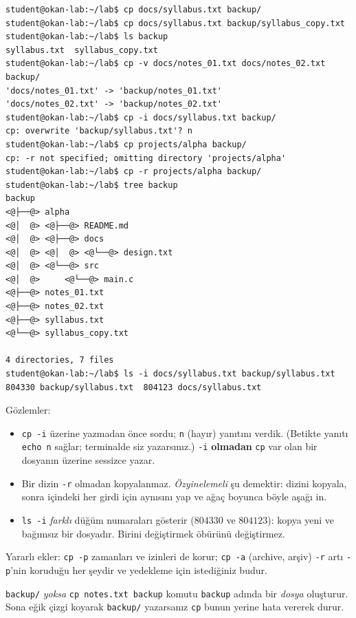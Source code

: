 \documentclass[11pt,a4paper]{article}
\newcommand{\cmd}[1]{\texttt{#1}}
\begin{document}
\begin{lstlisting}[style=term]
student@okan-lab:~/lab$ cp docs/syllabus.txt backup/
student@okan-lab:~/lab$ cp docs/syllabus.txt backup/syllabus_copy.txt
student@okan-lab:~/lab$ ls backup
syllabus.txt  syllabus_copy.txt
student@okan-lab:~/lab$ cp -v docs/notes_01.txt docs/notes_02.txt backup/
'docs/notes_01.txt' -> 'backup/notes_01.txt'
'docs/notes_02.txt' -> 'backup/notes_02.txt'
student@okan-lab:~/lab$ cp -i docs/syllabus.txt backup/
cp: overwrite 'backup/syllabus.txt'? n
student@okan-lab:~/lab$ cp projects/alpha backup/
cp: -r not specified; omitting directory 'projects/alpha'
student@okan-lab:~/lab$ cp -r projects/alpha backup/
student@okan-lab:~/lab$ tree backup
backup
<@├──@> alpha
<@│  @> <@├──@> README.md
<@│  @> <@├──@> docs
<@│  @> <@│  @> <@└──@> design.txt
<@│  @> <@└──@> src
<@│  @>     <@└──@> main.c
<@├──@> notes_01.txt
<@├──@> notes_02.txt
<@├──@> syllabus.txt
<@└──@> syllabus_copy.txt

4 directories, 7 files
student@okan-lab:~/lab$ ls -i docs/syllabus.txt backup/syllabus.txt
804330 backup/syllabus.txt  804123 docs/syllabus.txt
\end{lstlisting}

Gözlemler:
\begin{itemize}
  \item \cmd{cp -i} üzerine yazmadan önce sordu; \texttt{n} (hayır) yanıtını verdik. (Betikte yanıtı \cmd{echo n} sağlar; terminalde siz yazarsınız.) \cmd{-i} \textbf{olmadan} \cmd{cp} var olan bir dosyanın üzerine sessizce yazar.
  \item Bir dizin \cmd{-r} olmadan kopyalanmaz. \emph{Özyinelemeli} şu demektir: dizini kopyala, sonra içindeki her girdi için aynısını yap ve ağaç boyunca böyle aşağı in.
  \item \cmd{ls -i} \emph{farklı} düğüm numaraları gösterir ($804330$ ve $804123$): kopya yeni ve bağımsız bir dosyadır. Birini değiştirmek öbürünü değiştirmez.
\end{itemize}
Yararlı ekler: \cmd{cp -p} zamanları ve izinleri de korur; \cmd{cp -a} (archive, arşiv) \cmd{-r} artı \cmd{-p}'nin koruduğu her şeydir ve yedekleme için istediğiniz budur.

\begin{tryit}
\texttt{backup/} \emph{yoksa} \cmd{cp notes.txt backup} komutu \texttt{backup} adında bir \emph{dosya} oluşturur. Sona eğik çizgi koyarak \texttt{backup/} yazarsanız \cmd{cp} bunun yerine hata vererek durur.
\end{tryit}
\end{document}
